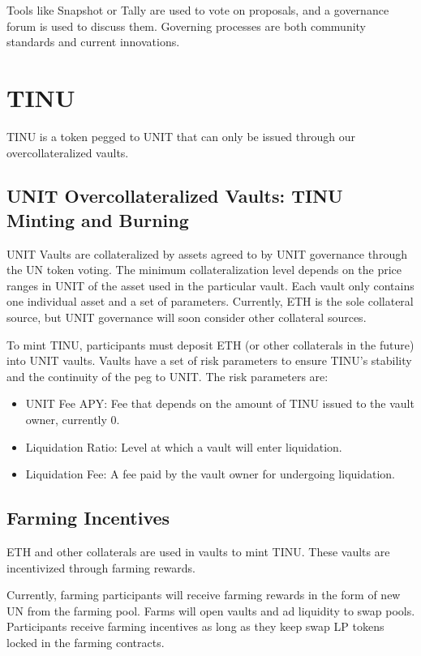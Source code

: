 \documentclass[12pt]{article}
\begin{document}
Tools like Snapshot or Tally are used to vote on proposals, and a governance forum is used to discuss them. Governing processes are both community standards and current innovations.

\section{TINU}

TINU is a token pegged to UNIT that can only be issued through our overcollateralized vaults.

\subsection{UNIT Overcollateralized Vaults: TINU Minting and Burning}

UNIT Vaults are collateralized by assets agreed to by UNIT governance through the UN token voting. The minimum collateralization level depends on the price ranges in UNIT of the asset used in the particular vault. Each vault only contains one individual asset and a set of parameters. Currently, ETH is the sole collateral source, but UNIT governance will soon consider other collateral sources.

To mint TINU, participants must deposit ETH (or other collaterals in the future) into UNIT vaults. Vaults have a set of risk parameters to ensure TINU’s stability and the continuity of the peg to UNIT. The risk parameters are:

\begin{itemize}
\item UNIT Fee APY: Fee that depends on the amount of TINU issued to the vault owner, currently 0.
\item Liquidation Ratio: Level at which a vault will enter liquidation.
\item Liquidation Fee: A fee paid by the vault owner for undergoing liquidation.
\end{itemize}


\subsection{Farming Incentives}

ETH and other collaterals are used in vaults to mint TINU. These vaults are incentivized through farming rewards.

Currently, farming participants will receive farming rewards in the form of new UN from the farming pool. Farms will open vaults and ad liquidity to swap pools. Participants receive farming incentives as long as they keep swap LP tokens locked in the farming contracts.
\end{document}
